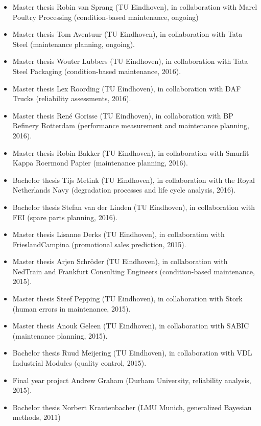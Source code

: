 \documentclass[a4paper]{simplecv}
\begin{document}
\begin{itemize}
\item Master thesis Robin van Sprang (TU Eindhoven),
in collaboration with Marel Poultry Processing (condition-based maintenance, ongoing)
\item Master thesis Tom Aventuur (TU Eindhoven),
in collaboration with Tata Steel (maintenance planning, ongoing).
\item Master thesis Wouter Lubbers (TU Eindhoven),
in collaboration with Tata Steel Packaging (condition-based maintenance, 2016).
\item Master thesis Lex Roording (TU Eindhoven),
in collaboration with DAF Trucks (reliability assessments, 2016).
\item Master thesis Ren\'{e} Gorisse (TU Eindhoven),
in collaboration with BP Refinery Rotterdam (performance measurement and maintenance planning, 2016).
\item Master thesis Robin Bakker (TU Eindhoven),
in collaboration with Smurfit Kappa Roermond Papier (maintenance planning, 2016).
\item Bachelor thesis Tijs Metink (TU Eindhoven),
in collaboration with the Royal Netherlands Navy (degradation processes and life cycle analysis, 2016).
\item Bachelor thesis Stefan van der Linden (TU Eindhoven),
in collaboration with FEI (spare parts planning, 2016).
\item Master thesis Lisanne Derks (TU Eindhoven),
in collaboration with FrieslandCampina (promotional sales prediction, 2015).
\item Master thesis Arjen Schr\"{o}der (TU Eindhoven),
in collaboration with NedTrain and Frankfurt Consulting Engineers (condition-based maintenance, 2015).
\item Master thesis Steef Pepping (TU Eindhoven),
in collaboration with Stork (human errors in maintenance, 2015).
\item Master thesis Anouk Geleen (TU Eindhoven),
in collaboration with SABIC (maintenance planning, 2015).
\item Bachelor thesis Ruud Meijering (TU Eindhoven),
in collaboration with VDL Industrial Modules (quality control, 2015).
\item Final year project Andrew Graham (Durham University, reliability analysis, 2015).
\item Bachelor thesis Norbert Krautenbacher (LMU Munich, generalized Bayesian methods, 2011)
\end{itemize}
\end{document}
